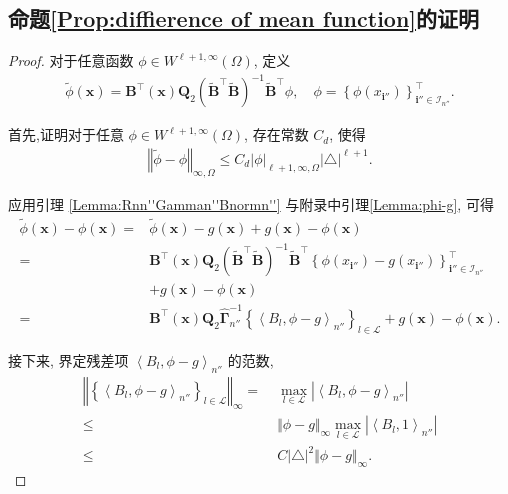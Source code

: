 \documentclass[a4paper,openay,14pt]{ctexbook}
\numberwithin{equation}{section}
\numberwithin{lem}{section}
\begin{document}
\subsection{命题\ref{Prop:diffierence of mean function}的证明}
\begin{proof}
    对于任意函数 $\phi \in W^{\ell+1,\infty}(\Omega)$, 定义  
\begin{align*}
\tilde{\phi}(\boldsymbol{x}) 
= \mathbf{B}^{\top}(\boldsymbol{x})
\mathbf{Q}_2
\left(\tilde{\mathbf{B}}^{\top}\tilde{\mathbf{B}}\right)^{-1}
\tilde{\mathbf{B}}^{\top}\phi, 
\quad 
\phi = \left\{\phi(x_{\mathbf{i}''})\right\}^{\top}_{\mathbf{i}''\in\mathcal{I}_{n''}}.
\end{align*}

首先,证明对于任意 $\phi\in W^{\ell+1,\infty}(\Omega)$, 存在常数 $C_d$, 使得
\begin{align}\label{inequ:tildephi}
\left\Vert \tilde\phi - \phi\right\Vert_{\infty,\Omega} 
\leq 
C_d 
\vert\phi\vert_{\ell+1,\infty,\Omega}
\vert \triangle\vert^{\ell+1}.  
\end{align}

应用引理 \ref{Lemma:Rnn''Gamman''Bnormn''} 与附录中引理\ref{Lemma:phi-g}, 可得
\begin{align*}
\tilde{\phi}(\boldsymbol{x}) - \phi(\boldsymbol{x}) 
=& \tilde{\phi}(\boldsymbol{x}) - g(\boldsymbol{x}) 
+ g(\boldsymbol{x})-\phi(\boldsymbol{x})\\
=&
\mathbf{B}^{\top}(\boldsymbol{x})
\mathbf{Q}_2
\left(\tilde{\mathbf{B}}^{\top}\tilde{\mathbf{B}}\right)^{-1}
\tilde{\mathbf{B}}^{\top}
\left\{\phi(x_{\mathbf{i}''}) - g(x_{\mathbf{i}''})\right\}^{\top}_{\mathbf{i}''\in\mathcal{I}_{n''}} 
\\
&+ g(\boldsymbol{x}) - \phi(\boldsymbol{x})\\
=&
\mathbf{B}^{\top}(\boldsymbol{x})
\mathbf{Q}_2
\hat{\boldsymbol{\Gamma}}^{-1}_{n''}
\left\{\left\langle B_l,\phi-g\right\rangle_{n''}\right\}_{l\in\mathcal{L}} 
+ g(\boldsymbol{x}) - \phi(\boldsymbol{x}).
\end{align*}

接下来, 界定残差项 $\left\langle B_l, \phi - g \right\rangle_{n''}$ 的范数,
\begin{align*}
\left\Vert
\left\{
\left\langle B_l,\phi-g\right\rangle_{n''}
\right\}_{l\in\mathcal{L}}
\right\Vert_{\infty} 
=&\; 
\max_{l\in\mathcal{L}}
\left\vert
\left< B_l,\phi-g\right>_{n''}
\right\vert\\
\leq &\; 
\Vert \phi-g\Vert_{\infty}
\max_{l\in\mathcal{L}}
\left\vert
\left<B_l,1\right>_{n''}
\right\vert\\
\leq &\; 
C\vert\triangle\vert^2
\Vert \phi-g\Vert_{\infty}.
\end{align*}


\end{proof}
\end{document}
